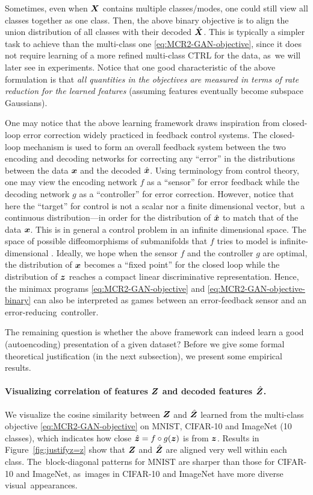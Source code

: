 \documentclass[\toplevelprefix/book-main.tex]{subfiles}
\begin{document}
Sometimes, even when $\bm{X}$ contains multiple classes/modes, one could still view all classes together as one class. Then, the above binary objective is to align the union distribution of all classes with their decoded $\hat {\bm{X}}$. This is typically a simpler task to achieve than the multi-class one \eqref{eq:MCR2-GAN-objective}, since it does not require learning of a more refined multi-class CTRL for the data, as~we will later see in experiments. Notice that one good characteristic of the above formulation is that {\em all quantities in the objectives are measured in terms of rate reduction for the learned features} (assuming features eventually become subspace Gaussians). 

One may notice that the above learning framework draws inspiration from closed-loop error correction widely practiced in feedback control systems. The closed-loop mechanism is used to form an overall feedback system between the two encoding and decoding networks for correcting any  ``error'' in the distributions between the data $\bm{x}$ and the decoded $\hat {\bm{x}}$. Using terminology from control theory, one may view the encoding network $f$ as a ``sensor'' for error feedback while the decoding network $g$ as a ``controller'' for error correction. However, notice that here the ``target'' for control is not a scalar nor a finite dimensional vector, but~a continuous distribution---in order for the distribution of $\hat {\bm{x}}$ to match that of the data $\bm{x}$. This is in general a control problem in an infinite dimensional space. The space of possible diffeomorphisms of submanifolds that $f$ tries to model is infinite-dimensional \cite{Lee2002IntroductionTS}. Ideally, we hope when the sensor $f$ and the controller $g$ are optimal, the distribution of $\bm{x}$ becomes a ``fixed point'' for the closed loop while the distribution of $\bm{z}$ reaches a compact linear discriminative representation. Hence, the minimax programs \eqref{eq:MCR2-GAN-objective} and \eqref{eq:MCR2-GAN-objective-binary} can also be interpreted as games between an error-feedback sensor and an error-reducing~controller.

The remaining question is whether the above framework can indeed learn a good (autoencoding) presentation of a given dataset? Before we give some formal theoretical justification (in the next subsection), we present some empirical results. 

\paragraph{Visualizing correlation of features $\bm{Z}$ and decoded features $\hat {\bm{Z}}$.} We visualize the cosine similarity between $\bm{Z}$ and $\hat{\bm{Z}}$ learned from the multi-class objective \eqref{eq:MCR2-GAN-objective} on MNIST, CIFAR-10 and ImageNet (10 classes), which indicates how close $\hat{\bm{z}} = f\circ g(\bm{z})$ is from $\bm{z}$. Results in Figure~\ref{fig:justifyz=z} show that $\bm{Z}$ and $\hat{\bm{Z}}$ are aligned very well within each class. The~block-diagonal patterns for MNIST are sharper than those for CIFAR-10 and ImageNet, as~images in CIFAR-10 and ImageNet have more diverse visual~appearances.
\end{document}
